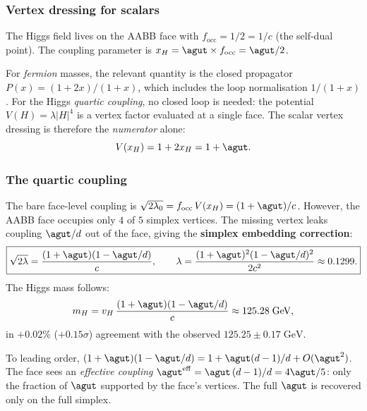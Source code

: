\subsubsection{Vertex dressing for scalars}

The Higgs field lives on the AABB face with $f_\mathrm{occ} = 1/2 = 1/c$ (the self-dual point).  The coupling parameter is $x_H = \agut \times f_\mathrm{occ} = \agut/2$.

For \emph{fermion} masses, the relevant quantity is the closed propagator $P(x) = (1+2x)/(1+x)$, which includes the loop normalisation $1/(1+x)$.  For the Higgs \emph{quartic coupling}, no closed loop is needed: the potential $V(H) = \lambda|H|^4$ is a vertex factor evaluated at a single face.  The scalar vertex dressing is therefore the \emph{numerator} alone:
\begin{equation}
V(x_H) = 1 + 2x_H = 1 + \agut.
\end{equation}

\subsubsection{The quartic coupling}

\begin{theorem}
\label{thm:higgs_quartic}
The bare face-level coupling is $\sqrt{2\lambda_0} = f_\mathrm{occ}\,V(x_H) = (1+\agut)/c$.  However, the AABB face occupies only $4$ of $5$ simplex vertices.  The missing vertex leaks coupling $\agut/d$ out of the face, giving the \textbf{simplex embedding correction}:
\begin{equation}
\boxed{\sqrt{2\lambda} = \frac{(1 + \agut)(1 - \agut/d)}{c},
\qquad
\lambda = \frac{(1 + \agut)^2(1 - \agut/d)^2}{2c^2} \approx 0.1299.}
\end{equation}
The Higgs mass follows:
\begin{equation}
m_H = v_H\,\frac{(1+\agut)(1-\agut/d)}{c} \approx 125.28\;\mathrm{GeV},
\end{equation}
in $+0.02\%$ ($+0.15\sigma$) agreement with the observed $125.25 \pm 0.17\;\mathrm{GeV}$.
\end{theorem}

\begin{remark}
To leading order, $(1+\agut)(1-\agut/d) = 1 + \agut(d-1)/d + O(\agut^2)$.  The face sees an \emph{effective coupling} $\agut^\mathrm{eff} = \agut\,(d-1)/d = 4\agut/5$: only the fraction of $\agut$ supported by the face's vertices.  The full $\agut$ is recovered only on the full simplex.
\end{remark}


